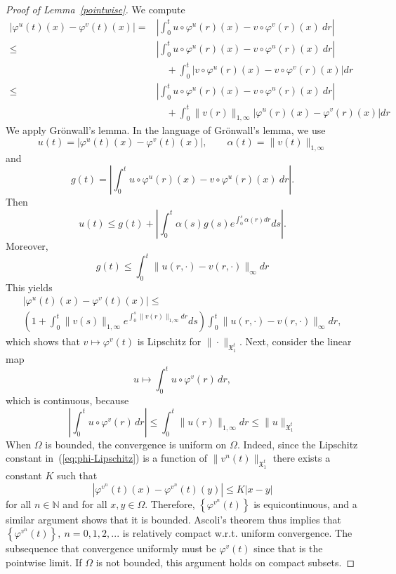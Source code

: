 \documentclass[a5paper,10pt,twoside]{article}
\newcommand{\N}{\ensuremath{\mathbb{N}}}
\newcommand{\X}{\ensuremath{\mathfrak{X}}}
\theoremstyle{plain}
\theoremstyle{definition}
\theoremstyle{remark}
\begin{document}
\begin{proof}[Proof of Lemma~\ref{pointwise}]
	We compute
	\begin{align*}
	\left|\varphi^u(t)(x)-\varphi^v(t)(x)\right| =& \left|\int_0^t u\circ \varphi^u(r)(x)-v\circ \varphi^v(r)(x)\ dr\right|\\
	\leq & \left|\int_0^t u\circ \varphi^u(r)(x)-v\circ \varphi^u(r)(x)\ dr\right|\\
	&\quad +\int_0^t \left|v\circ \varphi^u(r)(x)-v\circ \varphi^v(r)(x)\right| dr\\
	\leq & \left|\int_0^t u\circ \varphi^u(r)(x)-v\circ \varphi^u(r)(x)\ dr\right|\\
	&\quad +\int_0^t\|v(r)\|_{1,\infty} \left|\varphi^u(r)(x)-\varphi^v(r)(x)\right| dr
	\end{align*}
	We apply Grönwall's lemma. In the language of Grönwall's lemma, we use
	\[
	u(t)=\left|\varphi^u(t)(x)-\varphi^v(t)(x)\right|,\qquad \alpha(t)=\|v(t)\|_{1,\infty}
	\]
	and
	\[
	g(t)=\left|\int_0^t u\circ \varphi^u(r)(x)-v\circ \varphi^u(r)(x)\ dr\right|.
	\]
	Then
	\[
	u(t)\leq g(t)+\left|\int_0^t \alpha(s) g(s) e^{\int_0^s\alpha(r)dr}ds\right|.
	\]
	Moreover,
	\[
	g(t)\leq \int_0^t\|u(r,\cdot)-v(r,\cdot)\|_\infty dr
	\]
	This yields
	\begin{multline}\label{eq:v-Lipschitz}
	\left|\varphi^u(t)(x)-\varphi^v(t)(x)\right|\leq\\
	\left(1+\int_0^t \|v(s)\|_{1,\infty}e^{\int_0^s\|v(r)\|_{1,\infty}dr}ds\right)\int_0^t\|u(r,\cdot)-v(r,\cdot)\|_\infty dr,
	\end{multline}
	which shows that $v\mapsto\varphi^v(t)$ is Lipschitz for $\|\cdot\|_{\X_1^t}$. Next, consider the linear map
	\[
	u\mapsto \int_0^t u\circ \varphi^v(r)\,dr,
	\]
	which is continuous, because
	\[
	\left|\int_0^t u\circ \varphi^v(r)\,dr\right|\leq \int_0^t\|u(r)\|_{1,\infty}dr\leq \|u\|_{\X_1^t}
	\]
	When $\Omega$ is bounded, the convergence is uniform on $\Omega.$ Indeed, since the Lipschitz constant in~(\ref{eq:phi-Lipschitz}) is a function of $\|v^n(t)\|_{\X_1^t}$ there exists a constant $K$ such that 
	\[
	\left| \varphi^{v^n}(t)(x)-\varphi^{v^n}(t)(y)\right| \leq K|x-y|
	\]
	for all $n\in\N$ and for all $x,y\in\Omega$. Therefore, $\left\{\varphi^{v^n}(t)\right\}$ is equicontinuous, and a similar argument shows that it is bounded. Ascoli's theorem thus implies that $\left\{\varphi^{v^n}(t)\right\},\ n=0,1,2,...$ is relatively compact w.r.t. uniform convergence. The subsequence that convergence uniformly must be $\varphi^{v}(t)$ since that is the pointwise limit. If $\Omega$ is not bounded, this argument holds on compact subsets.
\end{proof}
\end{document}
